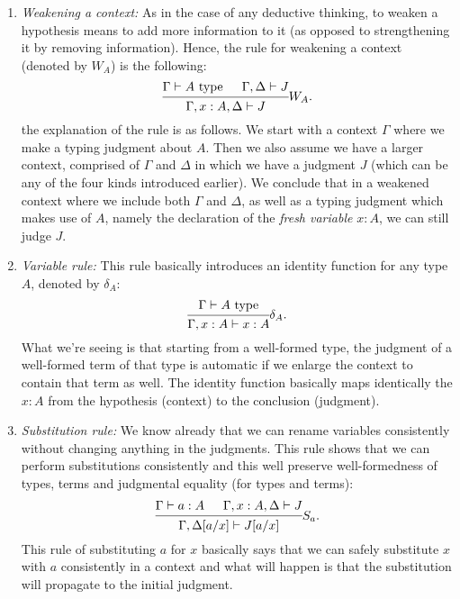 \begin{enumerate}[(1)]
\item \emph{Weakening a context:} As in the case of any deductive thinking,
  to weaken a hypothesis means to add more information to it (as opposed
  to strengthening it by removing information). Hence, the rule for
  weakening a context (denoted by $ W_A $) is the following:
  \[
    \begin{prooftree}
      \hypo{\Gamma \vdash A \text{ type}}
      \hypo{\Gamma, \Delta \vdash J}
      \infer2{\Gamma, x : A, \Delta \vdash J}
    \end{prooftree} W_A.
  \]
  the explanation of the rule is as follows. We start with a context
  $ \Gamma $ where we make a typing judgment about $ A $. Then we also
  assume we have a larger context, comprised of $ \Gamma $ and $ \Delta $
  in which we have a judgment $ J $ (which can be any of the four kinds
  introduced earlier). We conclude that in a weakened context where we
  include both $ \Gamma $ and $ \Delta $, as well as a typing judgment
  which makes use of $ A $, namely the declaration of the \emph{fresh variable}
  $ x : A $, we can still judge $ J $.
\item \emph{Variable rule:} This rule basically introduces an identity
  function for any type $ A $, denoted by $ \delta_A $:
  \begin{equation}
    \label{eq:variable-rule}
    \begin{prooftree}
      \hypo{\Gamma \vdash A \text{ type}}
      \infer1{\Gamma, x : A \vdash x : A}
    \end{prooftree} \delta_A.
  \end{equation}
  What we're seeing is that starting from a well-formed type, the judgment
  of a well-formed term of that type is automatic if we enlarge the
  context to contain that term as well. The identity function basically
  maps identically the $ x : A $ from the hypothesis (context) to the conclusion
  (judgment).
\item \emph{Substitution rule:} We know already that we can rename variables
  consistently without changing anything in the judgments. This rule shows
  that we can perform substitutions consistently and this well preserve
  well-formedness of types, terms and judgmental equality (for types and terms):
  \[
    \begin{prooftree}
      \hypo{\Gamma \vdash a : A}
      \hypo{\Gamma, x : A, \Delta \vdash J}
      \infer2{\Gamma, \Delta[a/x] \vdash J[a/x]}
    \end{prooftree} S_a.
  \]
  This rule of substituting $ a $ for $ x $ basically says that we can safely
  substitute $ x $ with $ a $ consistently in a context and what will happen
  is that the substitution will propagate to the initial judgment.


\end{enumerate}
